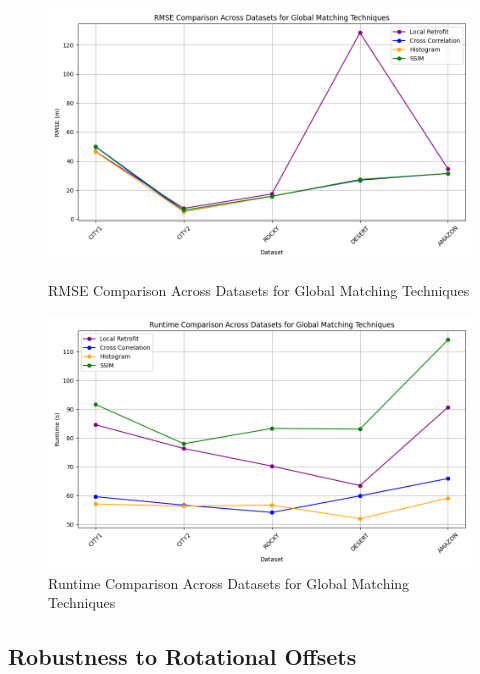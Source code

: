 \begin{figure}[H]
    \centering
    \begin{minipage}{0.45\textwidth}
        \centering
        \includegraphics[width=\textwidth]{./Chapter 4/testresults/rmse_global_matching.png}
        \caption{RMSE Comparison Across Datasets for Global Matching Techniques}
        \label{fig:rmse_global_matching}
    \end{minipage}\hfill
    \begin{minipage}{0.45\textwidth}
        \centering
        \includegraphics[width=\textwidth]{./Chapter 4/testresults/runtime_global_matching.png}
        \caption{Runtime Comparison Across Datasets for Global Matching Techniques}
        \label{fig:runtime_global_matching}
    \end{minipage}
\end{figure}

\subsection{Robustness to Rotational Offsets}

